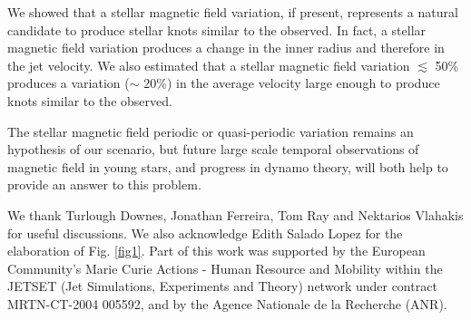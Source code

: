 \documentclass{emulateapj}
\begin{document}
We showed that a stellar magnetic field variation,
if present, represents a natural candidate to produce stellar 
knots similar to the observed.
In fact, a stellar magnetic field variation produces a change
in the inner radius and therefore in the jet velocity.
We also estimated that a stellar magnetic field variation 
$\lesssim$ 50\% produces a variation ($\sim$ 20\%) in 
the average velocity large enough to produce knots similar
to the observed.

The stellar magnetic field periodic or quasi-periodic variation
remains an hypothesis of our scenario,
but future large scale temporal observations of magnetic
field in young stars, and progress in dynamo theory, 
will both help to provide an answer to this problem.


\acknowledgments
   We thank Turlough Downes, Jonathan Ferreira, Tom Ray and Nektarios Vlahakis for useful discussions.
   We also acknowledge Edith Salado Lopez for the elaboration of Fig. \ref{fig1}.
   Part of this work was supported by the European Community's Marie 
   Curie Actions - Human Resource and Mobility within the JETSET (Jet 
   Simulations, Experiments and Theory) network under contract MRTN-CT-2004 
   005592, and by the Agence Nationale de la Recherche (ANR).
\end{document}
